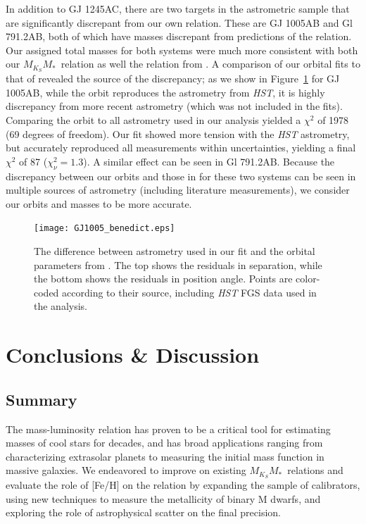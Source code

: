 \documentclass[twocolumn]{aastex62}
\newcommand{\mmk}{$M_{K_S}$\textendash$M_*$}
\begin{document}
In addition to GJ 1245AC, there are two targets in the \citet{Benedict2016} astrometric sample that are significantly discrepant from our own relation. These are GJ 1005AB and Gl 791.2AB, both of which have masses discrepant from predictions of the \citet{Benedict2016} relation. Our assigned total masses for both systems were much more consistent with both our \mmk\ relation as well the relation from \citet{Benedict2016}.  A comparison of our orbital fits to that of \citet{Benedict2016} revealed the source of the discrepancy; as we show in Figure~\ref{fig:gj1005} for GJ 1005AB, while the \citet{Benedict2016} orbit reproduces the astrometry from {\it HST}, it is highly discrepancy from more recent astrometry (which was not included in the \citet{Benedict2016} fits). Comparing the \citet{Benedict2016} orbit to all astrometry used in our analysis yielded a $\chi^2$ of 1978 (69 degrees of freedom). Our fit showed more tension with the {\it HST} astrometry, but accurately reproduced all measurements within uncertainties, yielding a final $\chi^2$ of 87 ($\chi^2_\nu=1.3$). A similar effect can be seen in Gl 791.2AB. Because the discrepancy between our orbits and those in \citet{Benedict2016} for these two systems can be seen in multiple sources of astrometry (including literature measurements), we consider our orbits and masses to be more accurate. 
 
 \begin{figure}[htb]
\begin{center}
\texttt{[image: GJ1005\_benedict.eps]}
\caption{The difference between astrometry used in our fit and the orbital parameters from \citet{Benedict2016}. The top shows the residuals in separation, while the bottom shows the residuals in position angle. Points are color-coded according to their source, including {\it HST} FGS data used in the \citet{Benedict2016} analysis. }
\label{fig:gj1005}
\end{center}
\end{figure}

\section{Conclusions \& Discussion}\label{sec:discussion} 

\subsection{Summary}
The mass-luminosity relation has proven to be a critical tool for estimating masses of cool stars for decades, and has broad applications ranging from characterizing extrasolar planets to measuring the initial mass function in massive galaxies. We endeavored to improve on existing \mmk\ relations and evaluate the role of [Fe/H] on the relation by expanding the sample of calibrators, using new techniques to measure the metallicity of binary M dwarfs, and exploring the role of astrophysical scatter on the final precision.
\end{document}
